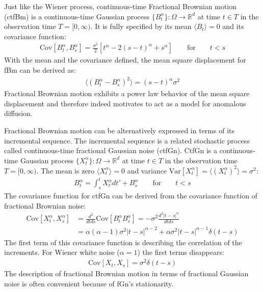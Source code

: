 \documentclass[
  a4paper,BCOR10mm,oneside,
  headsepline,footsepline,%
  fleqn,openbib
]{scrbook}
\begin{document}
Just like the Wiener process, continuous-time Fractional Brownian motion (ctfBm) is a continuous-time Gaussian process $\{B^{\alpha}_t\}: \Omega \rightarrow \mathbb{R}^d$ at time $t \in T$ in the observation time $T =[0, \infty)$. It is fully specified by its mean $\langle B_t \rangle=0$ and its covariance function:
\begin{align}
\mathrm{Cov}[B^{\alpha}_t,B^{\alpha}_s]=\frac{\sigma^2}{2}[t^{\alpha}-2(s-t)^{\alpha}+s^{\alpha}] \qquad \text{for} \qquad t<s
\end{align}
With the mean and the covariance defined, the mean square displacement for fBm can be derived as: 
\begin{align}
\label{MSDfbm}
 \langle (B^{\alpha}_{t}-B^{\alpha}_{s})^2 \rangle = (s-t)^\alpha \sigma^2
\end{align}
Fractional Brownian motion exhibits a power law behavior of the mean square displacement and therefore indeed motivates to act as a model for anomalous diffusion.\par Fractional Brownian motion can be alternatively expressed in terms of its incremental sequence. The incremental sequence is a related stochastic process called continuous-time fractional Gaussian noise (ctfGn). CtfGn is a continuous-time Gaussian process $\{X^{\alpha}_t\}: \Omega \rightarrow \mathbb{R}^d$ at time $t \in T$ in the observation time $T =[0, \infty)$. The mean is zero  $\langle X^{\alpha}_t \rangle=0$   and variance $\mathrm{Var}[X^{\alpha}_t]= \langle (X^{\alpha}_t)^2 \rangle=\sigma^2$:
\begin{align}
  B^{\alpha}_t=\int^t_s X^{\alpha}_{t'} d t' +  B^{\alpha}_s \qquad \text{for} \qquad t<s
\end{align}
The covariance function for ctfGn can be derived from the covariance function of fractional Brownian noise:
\begin{align}
\mathrm{Cov}[X^{\alpha}_t,X^{\alpha}_s]&= \frac{d^2}{dt ds} \mathrm{Cov}[B^{\alpha}_t B^{\alpha}_s]=-\sigma^2 \frac{d^2 |t-s|^{\alpha}}{dtds}\\
 &=\alpha (\alpha-1) \sigma^2 |t-s|^{\alpha-2}+\alpha \sigma^2 |t-s|^{\alpha-1} \delta(t-s)
\end{align}
The first term of this covariance function is describing the correlation of the increments. For Wiener white noise ($\alpha=1$) the first terms disappears:
\begin{align}
 \mathrm{Cov}[X_t,X_s]= \sigma^2 \delta(t-s)
\end{align}
The description of fractional Brownian motion in terms of fractional Gaussian noise is often convenient because of fGn's stationarity. 
\end{document}
